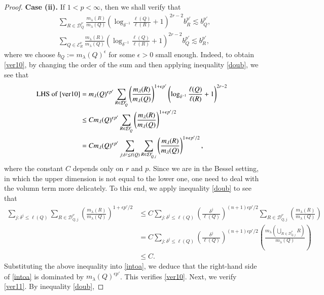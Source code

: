 \documentclass[12pt]{amsart}
\begin{document}
\begin{proof}
{\bf Case (ii).} If $1<p<\infty$, then we shall verify that
\begin{align}
&\sum_{R\in\mathcal{D}_{Q}^\nu}\frac{m_\lambda(R)}{m_\lambda(Q)}\left(\log_{\delta^{-1}}\frac{\ell(Q)}{\ell(R)}+1\right)^{2r-2}b_R^{p'}\lesssim b_Q^{p'},\label{ver10}\\
&\sum_{Q\in\mathcal{E}_{R}^\nu}\frac{m_\lambda(R)}{m_\lambda(Q)}\left(\log_{\delta^{-1}}\frac{\ell(Q)}{\ell(R)}+1\right)^{2r-2}b_Q^{p'}\lesssim b_R^{p'}\label{ver11},
\end{align}
where we choose $b_Q:=m_\lambda(Q)^\epsilon$ for some $\epsilon>0$ small enough. Indeed, to obtain \eqref{ver10}, by changing the order of the sum and then applying inequality \eqref{doub}, we see that
\begin{align}\label{intoa}
{\rm LHS}\ {\rm of}\ \eqref{ver10}&=m_\lambda(Q)^{\epsilon p'}\sum_{R\in\mathcal{D}_{Q}^\nu}\left(\frac{m_\lambda(R)}{m_\lambda(Q)}\right)^{1+\epsilon p'}\left(\log_{\delta^{-1}}\frac{\ell(Q)}{\ell(R)}+1\right)^{2r-2}\nonumber\\
&\leq C m_\lambda(Q)^{\epsilon p'}\sum_{R\in\mathcal{D}_{Q}^\nu}\left(\frac{m_\lambda(R)}{m_\lambda(Q)}\right)^{1+\epsilon p'/2}\nonumber\\
&= C m_\lambda(Q)^{\epsilon p'}\sum_{j:\delta^j\leq \ell(Q)}\sum_{R\in\mathcal{D}_{Q,j}^\nu}\left(\frac{m_\lambda(R)}{m_\lambda(Q)}\right)^{1+\epsilon p'/2},
\end{align}
where the constant $C$ depends only on $r$ and $p$. Since we are in the Bessel setting, in which the upper dimension is not equal to the lower one, one need to deal with the volumn term more delicately. To this end, we apply inequality \eqref{doub} to see that
\begin{align*}
\sum_{j:\delta^j\leq \ell(Q)}\sum_{R\in\mathcal{D}_{Q,j}^\nu}\left(\frac{m_\lambda(R)}{m_\lambda(Q)}\right)^{1+\epsilon p'/2}
&\leq C \sum_{j:\delta^j\leq \ell(Q)}\left(\frac{\delta^j}{\ell(Q)}\right)^{(n+1)\epsilon p'/2}\sum_{R\in\mathcal{D}_{Q,j}^\nu}\left(\frac{m_\lambda(R)}{m_\lambda(Q)}\right)\\
&=C\sum_{j:\delta^j\leq \ell(Q)}\left(\frac{\delta^j}{\ell(Q)}\right)^{(n+1)\epsilon p'/2}\left(\frac{m_\lambda(\bigcup_{R\in\mathcal{D}_{Q,j}^\nu}R)}{m_\lambda(Q)}\right)\\
&\leq C.
\end{align*}
Substituting the above inequality into \eqref{intoa}, we deduce that the right-hand side of \eqref{intoa} is dominated by $m_\lambda(Q)^{\epsilon p'}$. This verifies \eqref{ver10}. Next, we verify \eqref{ver11}. By inequality \eqref{doub},

\end{proof}
\end{document}
